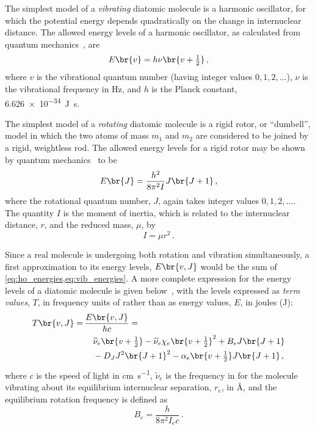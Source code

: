 The simplest model of a \emph{vibrating} diatomic molecule is a harmonic oscillator, for which the potential energy depends quadratically on the change in internuclear distance. 
The allowed energy levels of a harmonic oscillator, as calculated from quantum mechanics~\autocite{atkins94}, are
\begin{equation}
	E\br{v} = h \nu \br{v + \tfrac{1}{2}} \, ,
	\label{eq:ho_energies}
\end{equation}
where \( v \) is the vibrational quantum number (having integer values \( 0, 1, 2, \ldots \)), \( \nu \) is the vibrational frequency in \unit{\Hz}, and \( h \) is the Planck constant, \qty{6.626e-34}{\J\s}. 

The simplest model of a \emph{rotating} diatomic molecule is a rigid rotor, or ``dumbell'', model in which the two atoms of mass \( m_1 \) and \( m_2 \) are considered to be joined by a rigid, weightless rod. 
The allowed energy levels for a rigid rotor may be shown by quantum mechanics~\autocite{atkins94} to be
\begin{equation}
	E\br{J} = \frac{h^2}{8 \pi^2 I} J \br{J + 1} \, ,
	\label{eq:vib_energies}
\end{equation}
where the rotational quantum number, \( J \), again takes integer values \( 0, 1, 2, \ldots \).
The quantity \( I \) is the moment of inertia, which is related to the internuclear distance, \( r \), and the reduced mass, \( \mu \), by
\begin{equation}
	I = \mu r^2 \, .
	\label{eq:mom_of_intert}
\end{equation}

Since a real molecule is undergoing both rotation and vibration simultaneously, a first approximation to its energy levels, \( E\br{v, J} \) would be the sum of \cref{eq:ho_energies,eq:vib_energies}. 
A more complete expression for the energy levels of a diatomic molecule is given below~\autocite{herzberg89,kerr82}, with the levels expressed as \emph{term values}, \( T \), in frequency units of \unit{\wn} rather than as energy values, \( E \), in joules (\unit{\J}):
\begin{equation}
	\begin{aligned}
	T\br{v, J} =\,& \frac{E\br{v, J}}{h c} = \\
		& \quad \widetilde{\nu}_e\br{v + \tfrac{1}{2}} - \widetilde{\nu}_e \chi_e\br{v + \tfrac{1}{2}}^2 + B_e J \br{J + 1} \\
			& \quad - D_J J^2 \br{J + 1}^2 - \alpha_e \br{v + \tfrac{1}{2}} J \br{J + 1} \, ,
	\end{aligned}
	\label{eq:vib_rot_energies}
\end{equation}
where \( c \) is the speed of light in \unit{\cm \per \s}, \( \widetilde{\nu}_e \) is the frequency in \unit{\wn} for the molecule vibrating about its equilibrium internuclear separation, \( r_e \), in \unit{\angstrom}, and the equilibrium rotation frequency is defined as
\begin{equation}
	B_e = \frac{h}{8 \pi^2 I_e c} \, .
	\label{eq:b_e}
\end{equation}

